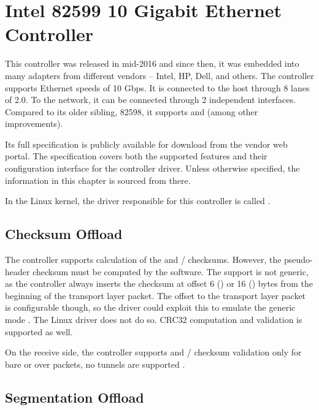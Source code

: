 \section{Intel 82599 10 Gigabit Ethernet Controller}
\label{nic:82599}
\renewcommand{\sect}[1]{\cite[#1]{82599}}

This controller was released in mid-2016 and since then, it was embedded into
many adapters from different vendors -- Intel, HP, Dell, and others. The
controller supports Ethernet speeds of 10 Gbps. It is connected to the host
through 8 lanes of  2.0. To the network, it can be connected through
2 independent interfaces. Compared to its older sibling, 82598, it supports
 and  (among other improvements).

Its full specification \cite{82599} is publicly available for download from the
vendor web portal. The specification covers both the supported features and their
configuration interface for the controller driver. Unless otherwise specified,
the information in this chapter is sourced from there.

In the Linux kernel, the driver responsible for this controller is called
.

\subsection{Checksum Offload}

The controller supports calculation of the  and /
checksums. However, the pseudo-header checksum must be computed by the software. The
support is not generic, as the controller always inserts the checksum at offset
6 () or 16 () bytes from the beginning of the transport layer packet.
The offset to the transport layer packet is configurable though, so the driver
could exploit this to emulate the generic mode \sect{7.2.5}. The Linux driver
does not do so.  CRC32 computation and validation is supported as well.

On the receive side, the controller supports  and /
checksum validation only for bare  or  over  packets, no
tunnels are supported \sect{7.1.11}.

\subsection{Segmentation Offload}

